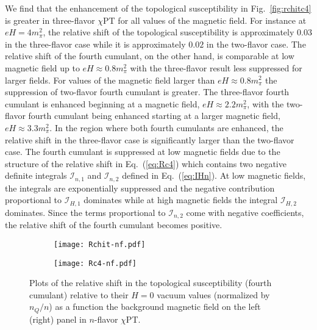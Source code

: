 \documentclass[12pt]{elsarticle}
\begin{document}
We find that the enhancement of the topological susceptibility in Fig.~\ref{fig:rchitc4} is greater in three-flavor $\chi$PT for all values of the magnetic field. For instance at $eH=4m_{\pi}^{2}$, the relative shift of the topological susceptibility is approximately $0.03$ in the three-flavor case while it is approximately $0.02$ in the two-flavor case. The relative shift of the fourth cumulant, on the other hand, is comparable at low magnetic field up to $eH\approx0.8m_{\pi}^{2}$ with the three-flavor result less suppressed for larger fields. For values of the magnetic field larger than $eH\approx0.8m_{\pi}^{2}$ the suppression of two-flavor fourth cumulant is greater. The three-flavor fourth cumulant is enhanced beginning at a magnetic field, $eH\approx2.2m_{\pi}^{2}$, with the two-flavor fourth cumulant being enhanced starting at a larger magnetic field, $eH\approx3.3m_{\pi}^{2}$. In the region where both fourth cumulants are enhanced, the relative shift in the three-flavor case is significantly larger than the two-flavor case. The fourth cumulant is suppressed at low magnetic fields due to the structure of the relative shift in Eq.~(\ref{eq:Rc4}) which contains two negative definite integrals $\mathcal{I}_{n,1}$ and $\mathcal{I}_{n,2}$ defined in Eq.~(\ref{eq:IHn}). At low magnetic fields, the integrals are exponentially suppressed and the negative contribution proportional to $\mathcal{I}_{H,1}$ dominates while at high magnetic fields the integral $\mathcal{I}_{H,2}$ dominates. Since the terms proportional to $\mathcal{I}_{n,2}$ come with negative coefficients, the relative shift of the fourth cumulant becomes positive.
\begin{figure}
	\centering
	\begin{subfigure}[b]{0.45\textwidth}
	\texttt{[image: Rchit-nf.pdf]}
	\end{subfigure}
	\begin{subfigure}[b]{0.45\textwidth}
	\texttt{[image: Rc4-nf.pdf]}
	\end{subfigure}
\caption{Plots of the relative shift in the topological susceptibility (fourth cumulant) relative to their $H=0$ vacuum values (normalized by $n_{Q}/n$) as a function the background magnetic field on the left (right) panel in $n$-flavor $\chi$PT.}
	\label{fig:rchitc4-nf}
\end{figure}
\end{document}
